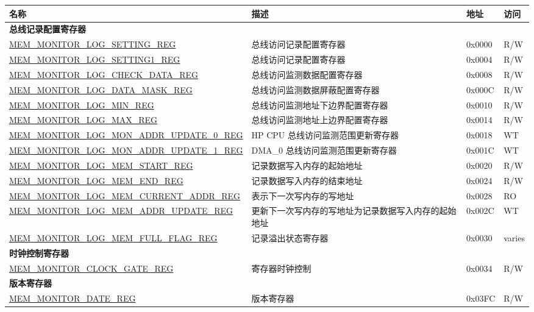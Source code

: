 \begin{longtable}{ | l| m{10cm} | l | l | }
\hline\rowcolor{lightgray}
{\bfseries 名称} & {\bfseries 描述} &  {\bfseries 地址} & {\bfseries 访问} \\ \hline
\endhead
\multicolumn{4}{|l|}{\textbf{总线记录配置寄存器}} \\ \hline
\hyperref[regdesc:MEMMONITORLOGSETTINGREG]{MEM\_MONITOR\_LOG\_SETTING\_REG} & 总线访问记录配置寄存器 & 0x0000 & R/W \\ \hline
\hyperref[regdesc:MEMMONITORLOGSETTING1REG]{MEM\_MONITOR\_LOG\_SETTING1\_REG} & 总线访问记录配置寄存器 & 0x0004 & R/W \\ \hline
\hyperref[regdesc:MEMMONITORLOGCHECKDATAREG]{MEM\_MONITOR\_LOG\_CHECK\_DATA\_REG} & 总线访问监测数据配置寄存器 & 0x0008 & R/W \\ \hline
\hyperref[regdesc:MEMMONITORLOGDATAMASKREG]{MEM\_MONITOR\_LOG\_DATA\_MASK\_REG} & 总线访问监测数据屏蔽配置寄存器 & 0x000C & R/W \\ \hline
\hyperref[regdesc:MEMMONITORLOGMINREG]{MEM\_MONITOR\_LOG\_MIN\_REG} & 总线访问监测地址下边界配置寄存器 & 0x0010 & R/W \\ \hline
\hyperref[regdesc:MEMMONITORLOGMAXREG]{MEM\_MONITOR\_LOG\_MAX\_REG} & 总线访问监测地址上边界配置寄存器 & 0x0014 & R/W \\ \hline
\hyperref[regdesc:MEMMONITORLOGMONADDRUPDATE0REG]{MEM\_MONITOR\_LOG\_MON\_ADDR\_UPDATE\_0\_REG} & HP CPU 总线访问监测范围更新寄存器 & 0x0018 & WT \\ \hline
\hyperref[regdesc:MEMMONITORLOGMONADDRUPDATE1REG]{MEM\_MONITOR\_LOG\_MON\_ADDR\_UPDATE\_1\_REG} & DMA\_0 总线访问监测范围更新寄存器 & 0x001C & WT \\ \hline
\hyperref[regdesc:MEMMONITORLOGMEMSTARTREG]{MEM\_MONITOR\_LOG\_MEM\_START\_REG} & 记录数据写入内存的起始地址 & 0x0020 & R/W \\ \hline
\hyperref[regdesc:MEMMONITORLOGMEMENDREG]{MEM\_MONITOR\_LOG\_MEM\_END\_REG} & 记录数据写入内存的结束地址 & 0x0024 & R/W \\ \hline
\hyperref[regdesc:MEMMONITORLOGMEMCURRENTADDRREG]{MEM\_MONITOR\_LOG\_MEM\_CURRENT\_ADDR\_REG} & 表示下一次写内存的写地址 & 0x0028 & RO \\ \hline
\hyperref[regdesc:MEMMONITORLOGMEMADDRUPDATEREG]{MEM\_MONITOR\_LOG\_MEM\_ADDR\_UPDATE\_REG} & 更新下一次写内存的写地址为记录数据写入内存的起始地址 & 0x002C & WT \\ \hline
\hyperref[regdesc:MEMMONITORLOGMEMFULLFLAGREG]{MEM\_MONITOR\_LOG\_MEM\_FULL\_FLAG\_REG} & 记录溢出状态寄存器 & 0x0030 & varies \\ \hline
\multicolumn{4}{|l|}{\textbf{时钟控制寄存器}} \\ \hline
\hyperref[regdesc:MEMMONITORCLOCKGATEREG]{MEM\_MONITOR\_CLOCK\_GATE\_REG} & 寄存器时钟控制 & 0x0034 & R/W \\ \hline
\multicolumn{4}{|l|}{\textbf{版本寄存器}} \\ \hline
\hyperref[regdesc:MEMMONITORDATEREG]{MEM\_MONITOR\_DATE\_REG} & 版本寄存器 & 0x03FC & R/W \\ \hline
\end{longtable}
